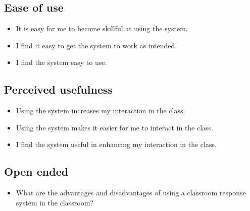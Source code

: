 \subsection{Ease of use}
\begin{itemize}
    \item It is easy for me to become skillful at using the system.
    \item I find it easy to get the system to work as intended.
    \item I find the system easy to use.
\end{itemize}

\subsection{Perceived usefulness}
\begin{itemize}
    \item Using the system increases my interaction in the class.
    \item Using the system makes it easier for me to interact in the class.
    \item I find the system useful in enhancing my interaction in the class.
\end{itemize}

\subsection{Open ended}
\begin{itemize}
    \item What are the advantages and disadvantages of using a classroom response system in the classroom?
\end{itemize}